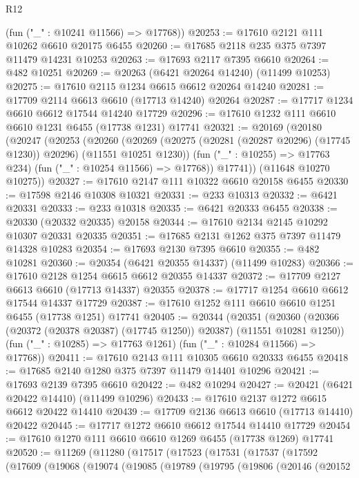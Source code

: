 \begin{lexlean}{R12}
\begin{coremodule}
{{{{{{{{{{{{{{{{{{{{{{{{{{{{{{{{{{{{{{{{{{{{{{{{{{{{{{{{{{{{{{{{{{{{{{{{{{{{{{{{{{      (fun ("_" : @10241 @11566) => @17768))
@20253 := @17610 @2121 @111 @10262 @6610 @20175 @6455
@20260 := @17685 @2118 @235 @375 @7397 @11479 @14231 @10253
@20263 := @17693 @2117 @7395 @6610
@20264 := @482 @10251
@20269 := @20263 (@6421 @20264 @14240) (@11499 @10253)
@20275 := @17610 @2115 @1234 @6615 @6612 @20264 @14240
@20281 := @17709 @2114 @6613 @6610 (@17713 @14240) @20264
@20287 := @17717 @1234 @6610 @6612 @17544 @14240 @17729
@20296 := @17610 @1232 @111 @6610 @6610 @1231 @6455 (@17738 @1231) @17741
@20321 := @20169
    (@20180
      (@20247
        (@20253
          (@20260
            (@20269 (@20275 (@20281 (@20287 @20296) (@17745 @1230)) @20296) (@11551 @10251 @1230))
            (fun ("_" : @10255) => @17763 @234)
            (fun ("_" : @10254 @11566) => @17768))
          @17741))
      (@11648 @10270 @10275))
@20327 := @17610 @2147 @111 @10322 @6610 @20158 @6455
@20330 := @17598 @2146 @10308 @10321
@20331 := @233 @10313
@20332 := @6421 @20331
@20333 := @233 @10318
@20335 := @6421 @20333 @6455
@20338 := @20330 (@20332 @20335) @20158
@20344 := @17610 @2134 @2145 @10292 @10307 @20331 @20335
@20351 := @17685 @2131 @1262 @375 @7397 @11479 @14328 @10283
@20354 := @17693 @2130 @7395 @6610
@20355 := @482 @10281
@20360 := @20354 (@6421 @20355 @14337) (@11499 @10283)
@20366 := @17610 @2128 @1254 @6615 @6612 @20355 @14337
@20372 := @17709 @2127 @6613 @6610 (@17713 @14337) @20355
@20378 := @17717 @1254 @6610 @6612 @17544 @14337 @17729
@20387 := @17610 @1252 @111 @6610 @6610 @1251 @6455 (@17738 @1251) @17741
@20405 := @20344
    (@20351
      (@20360 (@20366 (@20372 (@20378 @20387) (@17745 @1250)) @20387) (@11551 @10281 @1250))
      (fun ("_" : @10285) => @17763 @1261)
      (fun ("_" : @10284 @11566) => @17768))
@20411 := @17610 @2143 @111 @10305 @6610 @20333 @6455
@20418 := @17685 @2140 @1280 @375 @7397 @11479 @14401 @10296
@20421 := @17693 @2139 @7395 @6610
@20422 := @482 @10294
@20427 := @20421 (@6421 @20422 @14410) (@11499 @10296)
@20433 := @17610 @2137 @1272 @6615 @6612 @20422 @14410
@20439 := @17709 @2136 @6613 @6610 (@17713 @14410) @20422
@20445 := @17717 @1272 @6610 @6612 @17544 @14410 @17729
@20454 := @17610 @1270 @111 @6610 @6610 @1269 @6455 (@17738 @1269) @17741
@20520 := @11269
    (@11280
      (@17517
        (@17523
          (@17531
            (@17537
              (@17592
                (@17609
                  (@19068
                    (@19074
                      (@19085
                        (@19789
                          (@19795
                            (@19806
                              (@20146
                                (@20152
}}}}}}}}}}}}}}}}}}}}}}}}}}}}}}}}}}}}}}}}}}}}}}}}}}}}}}}}}}}}}}}}}}}}}}}}}}}}}}}}}}
\end{coremodule}
\end{lexlean}
